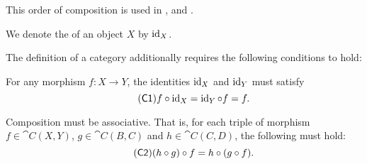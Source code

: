 \begin{definition}
\begin{thmenum}[series=def:category]
    This order of composition is used in \cite[7]{MacLane1994}, \cite[def. 1.1.1]{Leinster2016Basic} and \cite[def 3.1.]{Aluffi2009}.

     We denote the  of an object \( X \) by \( \operatorname{id}_X \).
  \end{thmenum}

  The definition of a category additionally requires the following conditions to hold:
  \begin{thmenum}[resume=def:category]
     For any morphism \( f: X \to Y \), the identities \( \operatorname{id}_X \) and \( \operatorname{id}_Y \) must satisfy
    \begin{equation}\label{eq:def:category/C1}\tag{\logic{C1}}
      f \bincirc \id_X = \id_Y \bincirc f = f.
    \end{equation}

     Composition must be associative. That is, for each triple of morphism \( f \in \cat{C}(X, Y) \), \( g \in \cat{C}(B, C) \) and \( h \in \cat{C}(C, D) \), the following must hold:
    \begin{equation}\label{eq:def:category/C2}\tag{\logic{C2}}
      (h \bincirc g) \bincirc f = h \bincirc (g \bincirc f).
    \end{equation}
  \end{thmenum}
\end{definition}


